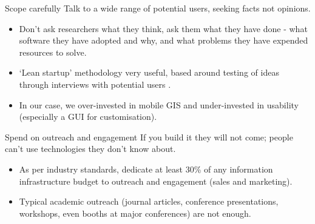 \documentclass[aspectratio=169, 12pt]{beamer} %
\begin{document}
\begin{frame}{Scope carefully}
  Talk to a wide range of potential users, seeking facts not opinions.
      \begin{itemize}[label=\textbullet]
        \item Don’t ask researchers what they think, ask them what they have done - what software they have adopted and why, and what problems they have expended resources to solve. 
        \item ‘Lean startup’ methodology very useful, based around  testing of ideas through interviews with potential users \cite{Strategyzer_AG2019-uu}.
        \item In our case, we over-invested in mobile GIS and under-invested in usability (especially a GUI for customisation).
    \end{itemize}
\end{frame}

\begin{frame}{Spend on outreach and engagement}
  If you build it they will not come; people can't use technologies they don't know about.
      \begin{itemize}[label=\textbullet]
        \item As per industry standards, dedicate at least 30\% of any information infrastructure budget to outreach and engagement (sales and marketing). 
        \item Typical academic outreach (journal articles, conference presentations, workshops, even booths at major conferences) are not enough.
    \end{itemize}
\end{frame}

\end{document}
